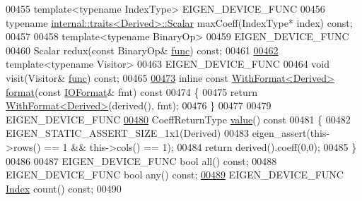 \begin{DoxyCode}
00455     \textcolor{keyword}{template}<\textcolor{keyword}{typename} IndexType> EIGEN\_DEVICE\_FUNC
00456     \textcolor{keyword}{typename} \hyperlink{struct_eigen_1_1internal_1_1traits}{internal::traits<Derived>::Scalar} maxCoeff(IndexType* index) \textcolor{keyword}{
      const};
00457 
00458     \textcolor{keyword}{template}<\textcolor{keyword}{typename} BinaryOp>
00459     EIGEN\_DEVICE\_FUNC
00460     Scalar redux(\textcolor{keyword}{const} BinaryOp& \hyperlink{structfunc}{func}) \textcolor{keyword}{const};
00461 
\hyperlink{group___core___module_adfabe2228a3ff52ad88e51675aa31557}{00462}     \textcolor{keyword}{template}<\textcolor{keyword}{typename} Visitor>
00463     EIGEN\_DEVICE\_FUNC
00464     \textcolor{keywordtype}{void} visit(Visitor& \hyperlink{structfunc}{func}) \textcolor{keyword}{const};
00465 
\hyperlink{group___core___module_ab231f1a6057f28d4244145e12c9fc0c7}{00473}     \textcolor{keyword}{inline} \textcolor{keyword}{const} \hyperlink{group___core___module_class_eigen_1_1_with_format}{WithFormat<Derived>} \hyperlink{group___core___module_ab231f1a6057f28d4244145e12c9fc0c7}{format}(\textcolor{keyword}{const} 
      \hyperlink{group___core___module_struct_eigen_1_1_i_o_format}{IOFormat}& fmt)\textcolor{keyword}{ const}
00474 \textcolor{keyword}{    }\{
00475       \textcolor{keywordflow}{return} \hyperlink{group___core___module_class_eigen_1_1_with_format}{WithFormat<Derived>}(derived(), fmt);
00476     \}
00477 
00479     EIGEN\_DEVICE\_FUNC
\hyperlink{group___core___module_a8da735a6bfc7012606acf787156d10a0}{00480}     CoeffReturnType \hyperlink{group___core___module_a8da735a6bfc7012606acf787156d10a0}{value}()\textcolor{keyword}{ const}
00481 \textcolor{keyword}{    }\{
00482       EIGEN\_STATIC\_ASSERT\_SIZE\_1x1(Derived)
00483       eigen\_assert(this->rows() == 1 && this->cols() == 1);
00484       \textcolor{keywordflow}{return} derived().coeff(0,0);
00485     \}
00486 
00487     EIGEN\_DEVICE\_FUNC \textcolor{keywordtype}{bool} all() \textcolor{keyword}{const};
00488     EIGEN\_DEVICE\_FUNC \textcolor{keywordtype}{bool} any() \textcolor{keyword}{const};
\hyperlink{group___core___module_acff625e5f44ffe92bf79d20223114c2d}{00489}     EIGEN\_DEVICE\_FUNC \hyperlink{namespace_eigen_a62e77e0933482dafde8fe197d9a2cfde}{Index} count() \textcolor{keyword}{const};
00490 

\end{DoxyCode}
